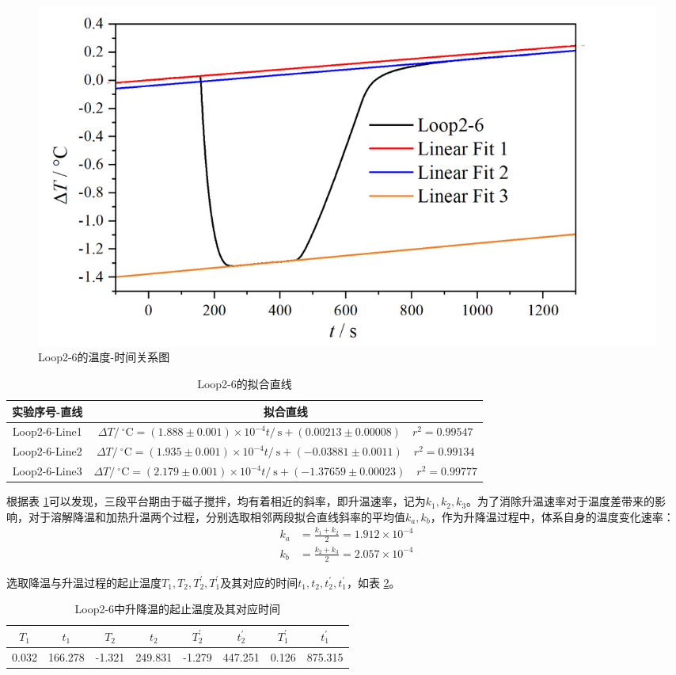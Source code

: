 \documentclass[cn,hazy,pku,12pt,normal,math=newtx,cite=super]{elegantnote}
\begin{document}
\begin{figure}[htbp]
    \centering
    \includegraphics[width=.75\textwidth]{figures/4-2.png}
    \caption{Loop2-6的温度-时间关系图}
    \label{fig:5a}
\end{figure}

\begin{table}[htbp]
    \centering
    \caption{Loop2-6的拟合直线}
    \begin{tabular}{cc}
        \toprule
         实验序号-直线 & 拟合直线 \\
         \midrule
         Loop2-6-Line1 & $\Delta T/\mathrm{~{}^\circ C} = (1.888\pm 0.001) \times 10^{-4}t/\mathrm{~s} + (0.00213\pm 0.00008) \quad r^2 = 0.99547$ \\
        Loop2-6-Line2 & $\Delta T/\mathrm{~{}^\circ C} = (1.935\pm 0.001) \times 10^{-4}t/\mathrm{~s} + (-0.03881\pm 0.0011) \quad r^2 = 0.99134$ \\
        Loop2-6-Line3 & $\Delta T/\mathrm{~{}^\circ C} = (2.179\pm 0.001) \times 10^{-4}t/\mathrm{~s} + (-1.37659\pm 0.00023) \quad r^2 = 0.99777$ \\
        \bottomrule
    \end{tabular}
    \label{tab:8}
\end{table}

根据表 \ref{tab:8}可以发现，三段平台期由于磁子搅拌，均有着相近的斜率，即升温速率，记为$k_1,k_2,k_3$。为了消除升温速率对于温度差带来的影响，对于溶解降温和加热升温两个过程，分别选取相邻两段拟合直线斜率的平均值$k_a, k_b$，作为升降温过程中，体系自身的温度变化速率：
\begin{align*}
    k_a &= \frac{k_1+k_2}{2} = 1.912\times 10^{-4}\\
    k_b &= \frac{k_2+k_3}{2} = 2.057\times 10^{-4}
\end{align*}

选取降温与升温过程的起止温度$T_1,T_2,T_2^\prime,T_1^\prime$及其对应的时间$t_1,t_2,t_2^\prime,t_1^\prime$，如表 \ref{tab:9}。
\begin{table}[htbp]
    \centering
    \caption{Loop2-6中升降温的起止温度及其对应时间}
    \begin{tabular}{cccccccc}
        \toprule
         $T_1$ & $t_1$ & $T_2$ & $t_2$ & $T_2^\prime$ & $t_2^\prime$ & $T_1^\prime$ & $t_1^\prime$\\
         \midrule
         0.032 & 166.278 & -1.321 & 249.831 & -1.279 & 447.251 & 0.126 & 875.315\\
         \bottomrule         
    \end{tabular}
    \label{tab:9}
\end{table}
\end{document}
